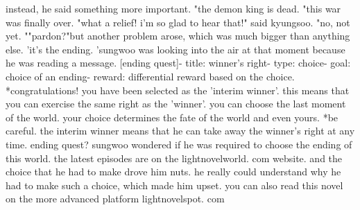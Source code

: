 instead, he said something more important.
"the demon king is dead.
"this war was finally over.
"what a relief! i'm so glad to hear that!" said kyungsoo.
"no, not yet.
""pardon?"but another problem arose, which was much bigger than anything else.
'it's the ending.
'sungwoo was looking into the air at that moment because he was reading a message.
[ending quest]- title: winner's right- type: choice- goal: choice of an ending- reward: differential reward based on the choice.
*congratulations! you have been selected as the 'interim winner'.
 this means that you can exercise the same right as the 'winner'.
 you can choose the last moment of the world.
 your choice determines the fate of the world and even yours.
*be careful.
 the interim winner means that he can take away the winner's right at any time.
ending quest? sungwoo wondered if he was required to choose the ending of this world.
the latest episodes are on the lightnovelworld.
com website.
and the choice that he had to make drove him nuts.
 he really could understand why he had to make such a choice, which made him upset.
 you can also read this novel on the more advanced platform lightnovelspot.
com

 